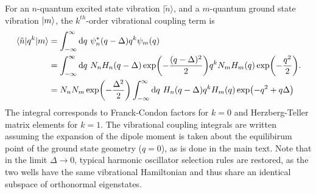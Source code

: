 \documentclass[aip, jcp, reprint, onecolumn, nofootinbib]{revtex4-2}
\begin{document}
For an $n$-quantum excited state vibration $| \tilde{n} \rangle$, and a $m$-quantum ground state vibration $\ket{m}$, the $k^{th}$-order vibrational coupling term is
\begin{equation}
	\begin{split}
		\mel{\tilde{n}}{q^k}{m} &= \int_{-\infty}^\infty \mathrm{d}q \ \psi^*_n(q-\Delta) q^k \psi_m(q)\\
		&= \int_{-\infty}^\infty \mathrm{d}q \ N_n H_n(q-\Delta) \exp(-\frac{(q - \Delta)^2}{2}) q^k N_m H_m(q) \exp(-\frac{q^2}{2}). \\
		&= N_n N_m \exp(-\frac{\Delta^2}{2}) \int_{-\infty}^\infty \mathrm{d}q \ H_n(q-\Delta) q^k H_m(q) \exp(-q^2 + q\Delta)
	\end{split}\label{key}
\end{equation}
The integral corresponds to Franck-Condon factors for $k=0$ and Herzberg-Teller matrix elements for $k=1$.
The vibrational coupling integrals are written assuming the expansion of the dipole moment is taken about the equilibirum point of the ground state geometry ($q=0$), as is done in the main text.
Note that in the limit $\Delta \rightarrow 0$, typical harmonic oscillator selection rules are restored, as the two wells have the same vibrational Hamiltonian and thus share an identical subspace of orthonormal eigenstates.
\end{document}
